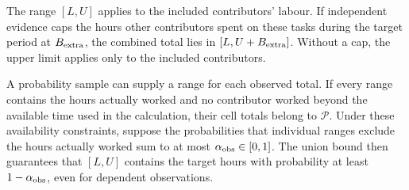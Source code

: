 The range $[L,U]$ applies to the included contributors' labour. If independent evidence caps the hours other contributors spent on these tasks during the target period at $B_{\rm extra}$, the combined total lies in $[L,U+B_{\rm extra}]$. Without a cap, the upper limit applies only to the included contributors.

A probability sample can supply a range for each observed total. If every range contains the hours actually worked and no contributor worked beyond the available time used in the calculation, their cell totals belong to $\mathcal P$. Under these availability constraints, suppose the probabilities that individual ranges exclude the hours actually worked sum to at most $\alpha_{\rm obs}\in[0,1]$. The union bound then guarantees that $[L,U]$ contains the target hours with probability at least $1-\alpha_{\rm obs}$, even for dependent observations.

